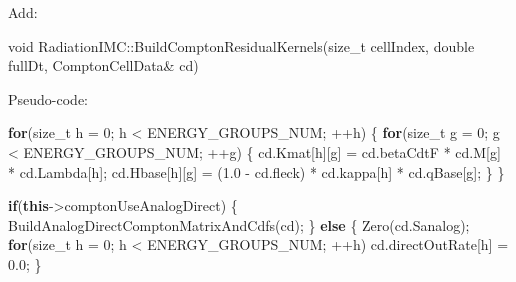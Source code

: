 \documentclass[
]{article}
\newenvironment{Shaded}{}{}
\newcommand{\ControlFlowTok}[1]{\textcolor[rgb]{0.00,0.44,0.13}{\textbf{#1}}}
\newcommand{\DataTypeTok}[1]{\textcolor[rgb]{0.56,0.13,0.00}{#1}}
\newcommand{\DecValTok}[1]{\textcolor[rgb]{0.25,0.63,0.44}{#1}}
\newcommand{\FloatTok}[1]{\textcolor[rgb]{0.25,0.63,0.44}{#1}}
\newcommand{\KeywordTok}[1]{\textcolor[rgb]{0.00,0.44,0.13}{\textbf{#1}}}
\newcommand{\NormalTok}[1]{#1}
\newcommand{\OperatorTok}[1]{\textcolor[rgb]{0.40,0.40,0.40}{#1}}
\begin{document}
Add:

\begin{Shaded}
\begin{Highlighting}[]
\DataTypeTok{void}\NormalTok{ RadiationIMC}\OperatorTok{::}\NormalTok{BuildComptonResidualKernels}\OperatorTok{(}\DataTypeTok{size\_t}\NormalTok{ cellIndex}\OperatorTok{,} \DataTypeTok{double}\NormalTok{ fullDt}\OperatorTok{,}\NormalTok{ ComptonCellData}\OperatorTok{\&}\NormalTok{ cd}\OperatorTok{)}
\end{Highlighting}
\end{Shaded}

Pseudo-code:

\begin{Shaded}
\begin{Highlighting}[]
\ControlFlowTok{for}\OperatorTok{(}\DataTypeTok{size\_t}\NormalTok{ h }\OperatorTok{=} \DecValTok{0}\OperatorTok{;}\NormalTok{ h }\OperatorTok{\textless{}}\NormalTok{ ENERGY\_GROUPS\_NUM}\OperatorTok{;} \OperatorTok{++}\NormalTok{h}\OperatorTok{)}
\OperatorTok{\{}
    \ControlFlowTok{for}\OperatorTok{(}\DataTypeTok{size\_t}\NormalTok{ g }\OperatorTok{=} \DecValTok{0}\OperatorTok{;}\NormalTok{ g }\OperatorTok{\textless{}}\NormalTok{ ENERGY\_GROUPS\_NUM}\OperatorTok{;} \OperatorTok{++}\NormalTok{g}\OperatorTok{)}
    \OperatorTok{\{}
\NormalTok{        cd}\OperatorTok{.}\NormalTok{Kmat}\OperatorTok{[}\NormalTok{h}\OperatorTok{][}\NormalTok{g}\OperatorTok{]} \OperatorTok{=}\NormalTok{ cd}\OperatorTok{.}\NormalTok{betaCdtF }\OperatorTok{*}\NormalTok{ cd}\OperatorTok{.}\NormalTok{M}\OperatorTok{[}\NormalTok{g}\OperatorTok{]} \OperatorTok{*}\NormalTok{ cd}\OperatorTok{.}\NormalTok{Lambda}\OperatorTok{[}\NormalTok{h}\OperatorTok{];}
\NormalTok{        cd}\OperatorTok{.}\NormalTok{Hbase}\OperatorTok{[}\NormalTok{h}\OperatorTok{][}\NormalTok{g}\OperatorTok{]} \OperatorTok{=} \OperatorTok{(}\FloatTok{1.0} \OperatorTok{{-}}\NormalTok{ cd}\OperatorTok{.}\NormalTok{fleck}\OperatorTok{)} \OperatorTok{*}\NormalTok{ cd}\OperatorTok{.}\NormalTok{kappa}\OperatorTok{[}\NormalTok{h}\OperatorTok{]} \OperatorTok{*}\NormalTok{ cd}\OperatorTok{.}\NormalTok{qBase}\OperatorTok{[}\NormalTok{g}\OperatorTok{];}
    \OperatorTok{\}}
\OperatorTok{\}}

\ControlFlowTok{if}\OperatorTok{(}\KeywordTok{this}\OperatorTok{{-}\textgreater{}}\NormalTok{comptonUseAnalogDirect}\OperatorTok{)}
\OperatorTok{\{}
\NormalTok{    BuildAnalogDirectComptonMatrixAndCdfs}\OperatorTok{(}\NormalTok{cd}\OperatorTok{);}
\OperatorTok{\}}
\ControlFlowTok{else}
\OperatorTok{\{}
\NormalTok{    Zero}\OperatorTok{(}\NormalTok{cd}\OperatorTok{.}\NormalTok{Sanalog}\OperatorTok{);}
    \ControlFlowTok{for}\OperatorTok{(}\DataTypeTok{size\_t}\NormalTok{ h }\OperatorTok{=} \DecValTok{0}\OperatorTok{;}\NormalTok{ h }\OperatorTok{\textless{}}\NormalTok{ ENERGY\_GROUPS\_NUM}\OperatorTok{;} \OperatorTok{++}\NormalTok{h}\OperatorTok{)}
\NormalTok{        cd}\OperatorTok{.}\NormalTok{directOutRate}\OperatorTok{[}\NormalTok{h}\OperatorTok{]} \OperatorTok{=} \FloatTok{0.0}\OperatorTok{;}
\OperatorTok{\}}


\end{Highlighting}
\end{Shaded}
\end{document}
